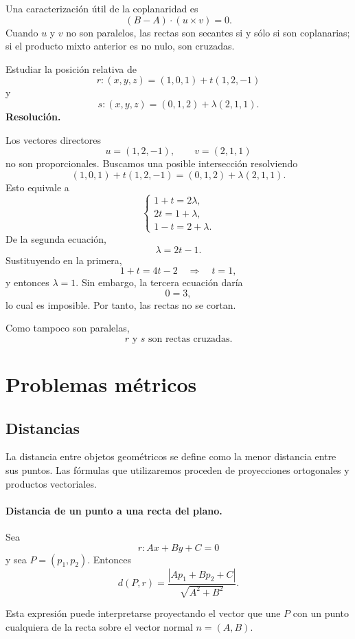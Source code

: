 Una caracterización útil de la coplanaridad es
\[
(B-A)\cdot(u\times v)=0.
\]
Cuando $u$ y $v$ no son paralelos, las rectas son secantes si y sólo si son coplanarias; si el producto mixto anterior es no nulo, son cruzadas.

\begin{solvedexercise}
Estudiar la posición relativa de
\[
r:(x,y,z)=(1,0,1)+t(1,2,-1)
\]
y
\[
s:(x,y,z)=(0,1,2)+\lambda(2,1,1).
\]
\tcblower
\textbf{Resolución.}\par\smallskip
Los vectores directores
\[
u=(1,2,-1),\qquad v=(2,1,1)
\]
no son proporcionales. Buscamos una posible intersección resolviendo
\[
(1,0,1)+t(1,2,-1)
=(0,1,2)+\lambda(2,1,1).
\]
Esto equivale a
\[
\begin{cases}
1+t=2\lambda,\\
2t=1+\lambda,\\
1-t=2+\lambda.
\end{cases}
\]
De la segunda ecuación,
\[
\lambda=2t-1.
\]
Sustituyendo en la primera,
\[
1+t=4t-2
\quad\Longrightarrow\quad
 t=1,
\]
y entonces $\lambda=1$. Sin embargo, la tercera ecuación daría
\[
0=3,
\]
lo cual es imposible. Por tanto, las rectas no se cortan.

Como tampoco son paralelas,
\[
\boxed{r\text{ y }s\text{ son rectas cruzadas}.}
\]
\end{solvedexercise}

\section{Problemas métricos}
\label{sec:problemas-metricos}

\subsection{Distancias}

La distancia entre objetos geométricos se define como la menor distancia entre sus puntos. Las fórmulas que utilizaremos proceden de proyecciones ortogonales y productos vectoriales.

\paragraph{Distancia de un punto a una recta del plano.}
Sea
\[
r:Ax+By+C=0
\]
y sea $P=(p_1,p_2)$. Entonces
\[
\boxed{
 d(P,r)=
 \frac{|Ap_1+Bp_2+C|}{\sqrt{A^2+B^2}}.}
\]

Esta expresión puede interpretarse proyectando el vector que une $P$ con un punto cualquiera de la recta sobre el vector normal $n=(A,B)$.

